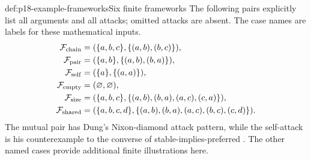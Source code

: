 \begin{hbdefinition}{def:p18-example-frameworks}{Six finite frameworks}
The following pairs explicitly list all arguments and all attacks; omitted
attacks are absent. The case names are labels for these mathematical inputs.
\[
\begin{aligned}
 \mathcal F_{\rm chain}
   &=(\{a,b,c\},\{(a,b),(b,c)\}),\\
 \mathcal F_{\rm pair}
   &=(\{a,b\},\{(a,b),(b,a)\}),\\
 \mathcal F_{\rm self}
   &=(\{a\},\{(a,a)\}),\\
 \mathcal F_{\rm empty}
   &=(\varnothing,\varnothing),\\
 \mathcal F_{\rm size}
   &=(\{a,b,c\},\{(a,b),(b,a),(a,c),(c,a)\}),\\
 \mathcal F_{\rm shared}
   &=(\{a,b,c,d\},\{(a,b),(b,a),(a,c),(b,c),(c,d)\}).
\end{aligned}
\]
The mutual pair has Dung's Nixon-diamond attack pattern, while the self-attack
is his counterexample to the converse of stable-implies-preferred
\cite[example~9 and lemma~15, pp.~327--328]{Dung1995}.
The other named cases provide additional finite illustrations here.
\end{hbdefinition}

